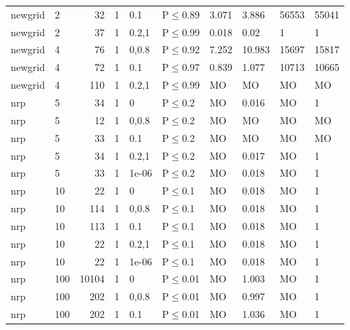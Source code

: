 \begin{longtable}{llrrllllll}
 newgrid       & 2        &     	32 & 1 & 0.1   & P$\leq$0.89  & 3.071    & 3.886    & 56553   & 55041  \\
 newgrid       & 2        &     	37 & 1 & 0.2,1 & P$\leq$0.99  & 0.018    & 0.02     & 1       & 1      \\
 newgrid       & 4        &     	76 & 1 & 0,0.8 & P$\leq$0.92  & 7.252    & 10.983   & 15697   & 15817  \\
 newgrid       & 4        &     	72 & 1 & 0.1   & P$\leq$0.97  & 0.839    & 1.077    & 10713   & 10665  \\
 newgrid       & 4        &    	110 & 1 & 0.2,1 & P$\leq$0.99  & MO       & MO       & MO      & MO     \\
 nrp           & 5        &     	34 & 1 & 0     & P$\leq$0.2   & MO       & 0.016    & MO      & 1      \\
 nrp           & 5        &     	12 & 1 & 0,0.8 & P$\leq$0.2   & MO       & MO       & MO      & MO     \\
 nrp           & 5        &     	33 & 1 & 0.1   & P$\leq$0.2   & MO       & MO       & MO      & MO     \\
 nrp           & 5        &     	34 & 1 & 0.2,1 & P$\leq$0.2   & MO       & 0.017    & MO      & 1      \\
 nrp           & 5        &     	33 & 1 & 1e-06 & P$\leq$0.2   & MO       & 0.018    & MO      & 1      \\
 nrp           & 10       &     	22 & 1 & 0     & P$\leq$0.1   & MO       & 0.018    & MO      & 1      \\
 nrp           & 10       &    	114 & 1 & 0,0.8 & P$\leq$0.1   & MO       & 0.018    & MO      & 1      \\
 nrp           & 10       &    	113 & 1 & 0.1   & P$\leq$0.1   & MO       & 0.018    & MO      & 1      \\
 nrp           & 10       &     	22 & 1 & 0.2,1 & P$\leq$0.1   & MO       & 0.018    & MO      & 1      \\
 nrp           & 10       &     	22 & 1 & 1e-06 & P$\leq$0.1   & MO       & 0.018    & MO      & 1      \\
 nrp           & 100      &  	10104 & 1 & 0     & P$\leq$0.01  & MO       & 1.003    & MO      & 1      \\
 nrp           & 100      &    	202 & 1 & 0,0.8 & P$\leq$0.01  & MO       & 0.997    & MO      & 1      \\
 nrp           & 100      &    	202 & 1 & 0.1   & P$\leq$0.01  & MO       & 1.036    & MO      & 1      \\

\end{longtable}
